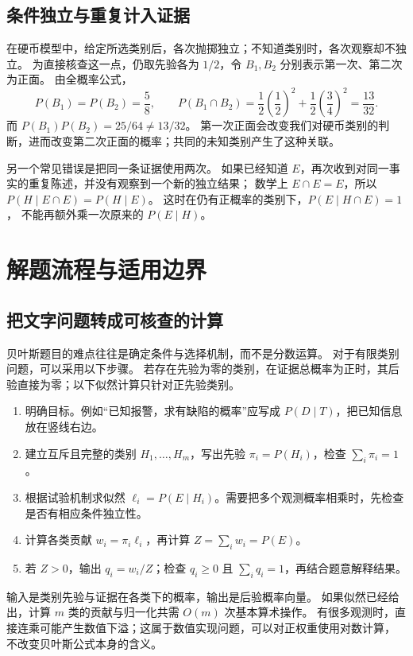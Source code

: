 \documentclass[UTF8,12pt,a4paper,fontset=fandol]{ctexart}
\begin{document}
\subsection{条件独立与重复计入证据}

在硬币模型中，给定所选类别后，各次抛掷独立；不知道类别时，各次观察却不独立。
为直接核查这一点，仍取先验各为 $1/2$，令 $B_1,B_2$ 分别表示第一次、第二次为正面。
由全概率公式，
\[
  P(B_1)=P(B_2)=\frac58,\qquad
  P(B_1\cap B_2)=\frac12\left(\frac12\right)^2+
  \frac12\left(\frac34\right)^2=\frac{13}{32}.
\]
而 $P(B_1)P(B_2)=25/64\ne13/32$。
第一次正面会改变我们对硬币类别的判断，进而改变第二次正面的概率；共同的未知类别产生了这种关联。

另一个常见错误是把同一条证据使用两次。
如果已经知道 $E$，再次收到对同一事实的重复陈述，并没有观察到一个新的独立结果；
数学上 $E\cap E=E$，所以 $P(H\mid E\cap E)=P(H\mid E)$。
这时在仍有正概率的类别下，$P(E\mid H\cap E)=1$，
不能再额外乘一次原来的 $P(E\mid H)$。

\section{解题流程与适用边界}
\label{sec:bayes-method}

\subsection{把文字问题转成可核查的计算}

贝叶斯题目的难点往往是确定条件与选择机制，而不是分数运算。
对于有限类别问题，可以采用以下步骤。
若存在先验为零的类别，在证据总概率为正时，其后验直接为零；以下似然计算只针对正先验类别。
\begin{enumerate}
  \item 明确目标。例如“已知报警，求有缺陷的概率”应写成 $P(D\mid T)$，把已知信息放在竖线右边。
  \item 建立互斥且完整的类别 $H_1,\ldots,H_m$，写出先验 $\pi_i=P(H_i)$，检查 $\sum_i\pi_i=1$。
  \item 根据试验机制求似然 $\ell_i=P(E\mid H_i)$。需要把多个观测概率相乘时，先检查是否有相应条件独立性。
  \item 计算各类贡献 $w_i=\pi_i\ell_i$，再计算 $Z=\sum_iw_i=P(E)$。
  \item 若 $Z>0$，输出 $q_i=w_i/Z$；检查 $q_i\geq0$ 且 $\sum_iq_i=1$，再结合题意解释结果。
\end{enumerate}
输入是类别先验与证据在各类下的概率，输出是后验概率向量。
如果似然已经给出，计算 $m$ 类的贡献与归一化共需 $O(m)$ 次基本算术操作。
有很多观测时，直接连乘可能产生数值下溢；这属于数值实现问题，可以对正权重使用对数计算，
不改变贝叶斯公式本身的含义。
\end{document}
